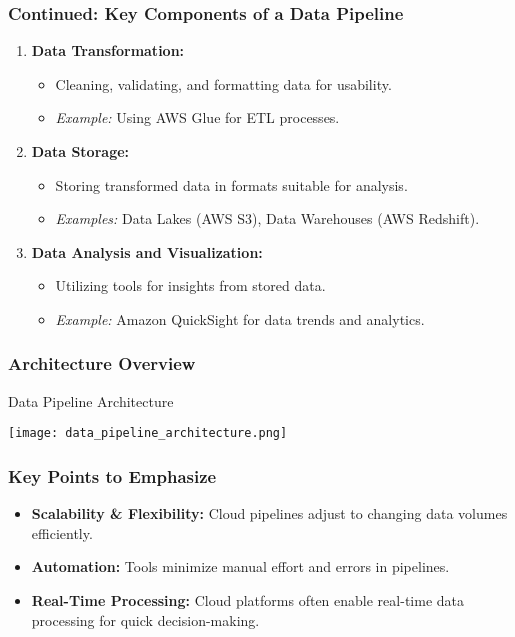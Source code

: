 \documentclass[aspectratio=169]{beamer}
\begin{document}
\begin{frame}[fragile]
    \frametitle{Continued: Key Components of a Data Pipeline}
    \begin{enumerate}[resume]
        \item \textbf{Data Transformation:}
            \begin{itemize}
                \item Cleaning, validating, and formatting data for usability.
                \item \textit{Example:} Using AWS Glue for ETL processes.
            \end{itemize}
        \item \textbf{Data Storage:}
            \begin{itemize}
                \item Storing transformed data in formats suitable for analysis.
                \item \textit{Examples:} Data Lakes (AWS S3), Data Warehouses (AWS Redshift).
            \end{itemize}
        \item \textbf{Data Analysis and Visualization:}
            \begin{itemize}
                \item Utilizing tools for insights from stored data.
                \item \textit{Example:} Amazon QuickSight for data trends and analytics.
            \end{itemize}
    \end{enumerate}
\end{frame}

\begin{frame}[fragile]
    \frametitle{Architecture Overview}
    \begin{block}{Data Pipeline Architecture}
    \begin{center}
    \texttt{[image: data\_pipeline\_architecture.png]} %
    \end{center}
    \end{block}
\end{frame}

\begin{frame}[fragile]
    \frametitle{Key Points to Emphasize}
    \begin{itemize}
        \item \textbf{Scalability \& Flexibility:} Cloud pipelines adjust to changing data volumes efficiently.
        \item \textbf{Automation:} Tools minimize manual effort and errors in pipelines.
        \item \textbf{Real-Time Processing:} Cloud platforms often enable real-time data processing for quick decision-making.
    \end{itemize}
\end{frame}
\end{document}

